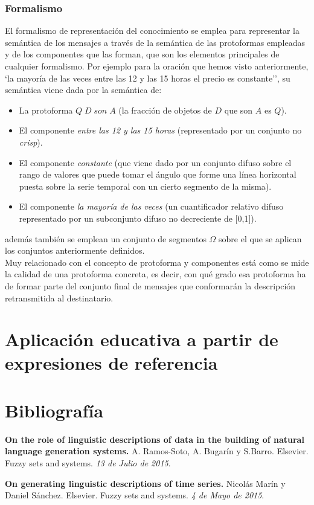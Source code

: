 \documentclass[10pt,a4paper]{article}
\begin{document}
\subsubsection{Formalismo}

El formalismo de representación del conocimiento se emplea para representar la semántica de los mensajes a través de la semántica de las protoformas empleadas y de los componentes que las forman, que son los elementos principales de cualquier formalismo. Por ejemplo para la oración que hemos visto anteriormente, `la mayoría de las veces entre las 12 y las 15 horas el precio es constante'', su semántica viene dada por la semántica de:

\begin{itemize}
\item La protoforma $Q \; D \; son \; A$ (la fracción de objetos de $D$ que son $A$ es $Q$).
\item El componente \textit{entre las 12 y las 15 horas} (representado por un conjunto no \textit{crisp}).
\item El componente \textit{constante} (que viene dado por un conjunto difuso sobre el rango de valores que puede tomar el ángulo que forme una línea horizontal puesta sobre la serie temporal con un cierto segmento de la misma).
\item El componente \textit{la mayoría de las veces} (un cuantificador relativo difuso representado por un subconjunto difuso no decreciente de [0,1]).
\end{itemize}

además también se emplean un conjunto de segmentos $\Omega$ sobre el que se aplican los conjuntos anteriormente definidos.\\

Muy relacionado con el concepto de protoforma y componentes está como se mide la calidad de una protoforma concreta, es decir, con qué grado esa protoforma ha de formar parte del conjunto final de mensajes que conformarán la descripción retransmitida al destinatario. 





\section{Aplicación educativa a partir de expresiones de referencia}

\newpage

\section{Bibliografía}
\begin{enumerate}[{[}1{]}]
\item \textbf{On the role of linguistic descriptions of data in the building of natural language generation systems.} A. Ramos-Soto, A. Bugarín y S.Barro. Elsevier. Fuzzy sets and systems. \textit{13 de Julio de 2015}.
\item \textbf{On generating linguistic descriptions of time series.} Nicolás Marín y Daniel Sánchez. Elsevier. Fuzzy sets and systems. \textit{4 de Mayo de 2015}.
\end{enumerate}
\end{document}
